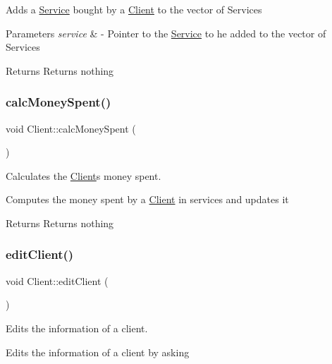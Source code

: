 Adds a \hyperlink{class_service}{Service} bought by a \hyperlink{class_client}{Client} to the vector of Services


\begin{DoxyParams}{Parameters}
{\em service} & -\/ Pointer to the \hyperlink{class_service}{Service} to he added to the vector of Services \\
\hline
\end{DoxyParams}
\begin{DoxyReturn}{Returns}
Returns nothing 
\end{DoxyReturn}
\mbox{\label{class_client_a65027bc2da365dfdbbf0393ee2697586}} 
\subsubsection{\texorpdfstring{calc\+Money\+Spent()}{calcMoneySpent()}}
{\footnotesize\ttfamily void Client\+::calc\+Money\+Spent (\begin{DoxyParamCaption}{ }\end{DoxyParamCaption})}



Calculates the \hyperlink{class_client}{Client}\textquotesingle{}s money spent. 

Computes the money spent by a \hyperlink{class_client}{Client} in services and updates it

\begin{DoxyReturn}{Returns}
Returns nothing 
\end{DoxyReturn}
\mbox{\label{class_client_afe8b004559fd1480fb8747c352f167db}} 
\subsubsection{\texorpdfstring{edit\+Client()}{editClient()}}
{\footnotesize\ttfamily void Client\+::edit\+Client (\begin{DoxyParamCaption}{ }\end{DoxyParamCaption})}



Edits the information of a client. 

Edits the information of a client by asking

